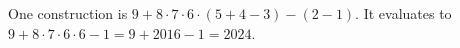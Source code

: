 One construction is $\boxed{9+8\cdot7\cdot6\cdot(5+4-3)-(2-1)}$. It evaluates to $9+8\cdot7\cdot6\cdot6-1=9+2016-1=2024$.
